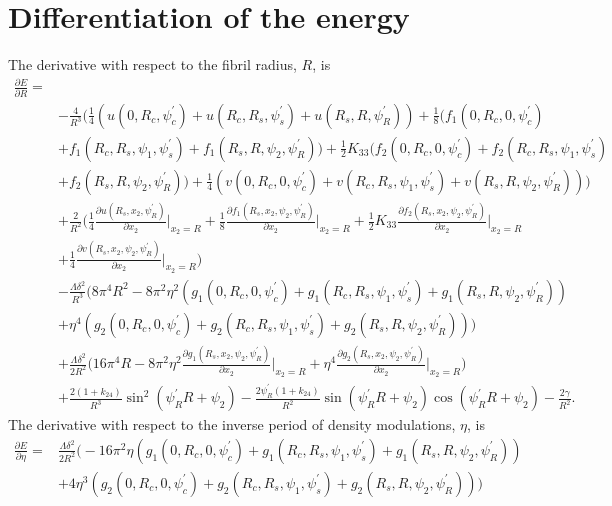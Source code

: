 \documentclass[12pt]{article}
\begin{document}
\section{Differentiation of the energy}
The derivative with respect to the fibril radius, $R$, is
\begin{align}
\frac{\partial E}{\partial R}=&\nonumber\\
&-\frac{4}{R^3}\bigg(\frac{1}{4}(u(0,R_c,\psi_c^{\prime})+u(R_c,R_s,\psi_s^{\prime})+u(R_s,R,\psi_R^{\prime}))+\frac{1}{8}(f_1(0,R_c,0,\psi_c^{\prime})\nonumber\\
&+f_1(R_c,R_s,\psi_1,\psi_s^{\prime})+f_1(R_s,R,\psi_2,\psi_R^{\prime}))+\frac{1}{2}K_{33}(f_2(0,R_c,0,\psi_c^{\prime})+f_2(R_c,R_s,\psi_1,\psi_s^{\prime})\nonumber\\
&+f_2(R_s,R,\psi_2,\psi_R^{\prime}))+\frac{1}{4}(v(0,R_c,0,\psi_c^{\prime})+v(R_c,R_s,\psi_1,\psi_s^{\prime})+v(R_s,R,\psi_2,\psi_R^{\prime}))\bigg)\nonumber\\
&+\frac{2}{R^2}\bigg(\frac{1}{4}\frac{\partial u(R_s,x_2,\psi_R^{\prime})}{\partial x_2}\bigg|_{x_2=R}+\frac{1}{8}\frac{\partial f_1(R_s,x_2,\psi_2,\psi_R^{\prime})}{\partial x_2}\bigg|_{x_2=R}+\frac{1}{2}K_{33}\frac{\partial f_2(R_s,x_2,\psi_2,\psi_R^{\prime})}{\partial x_2}\bigg|_{x_2=R}\nonumber\\
&+\frac{1}{4}\frac{\partial v(R_s,x_2,\psi_2,\psi_R^{\prime})}{\partial x_2}\bigg|_{x_2=R}\bigg)\nonumber\\
&-\frac{\Lambda\delta^2}{R^3}\big(8\pi^4R^2-8\pi^2\eta^2(g_1(0,R_c,0,\psi_c^{\prime})+g_1(R_c,R_s,\psi_1,\psi_s^{\prime})+g_1(R_s,R,\psi_2,\psi_R^{\prime}))\nonumber\\
&+\eta^4(g_2(0,R_c,0,\psi_c^{\prime})+g_2(R_c,R_s,\psi_1,\psi_s^{\prime})+g_2(R_s,R,\psi_2,\psi_R^{\prime}))\big)\nonumber\\
&+\frac{\Lambda\delta^2}{2R^2}\bigg(16\pi^4R-8\pi^2\eta^2\frac{\partial g_1(R_s,x_2,\psi_2,\psi_R^{\prime})}{\partial x_2}\bigg|_{x_2=R}+\eta^4\frac{\partial g_2(R_s,x_2,\psi_2,\psi_R^{\prime})}{\partial x_2}\bigg|_{x_2=R}\bigg)\nonumber\\
&+\frac{2(1+k_{24})}{R^3}\sin^2(\psi_R^{\prime}R+\psi_2)-\frac{2\psi_R^{\prime}(1+k_{24})}{R^2}\sin(\psi_R^{\prime}R+\psi_2)\cos(\psi_R^{\prime}R+\psi_2)-\frac{2\gamma}{R^2}.\label{eq:dEdR}
\end{align}
The derivative with respect to the inverse period of density modulations, $\eta$, is
\begin{align}
\frac{\partial E}{\partial \eta}=&
\frac{\Lambda\delta^2}{2R^2}\big(-16\pi^2\eta(g_1(0,R_c,0,\psi_c^{\prime})+g_1(R_c,R_s,\psi_1,\psi_s^{\prime})+g_1(R_s,R,\psi_2,\psi_R^{\prime}))\nonumber\\
&+4\eta^3(g_2(0,R_c,0,\psi_c^{\prime})+g_2(R_c,R_s,\psi_1,\psi_s^{\prime})+g_2(R_s,R,\psi_2,\psi_R^{\prime}))\big)\label{eq:dEdeta}
\end{align}
\end{document}
